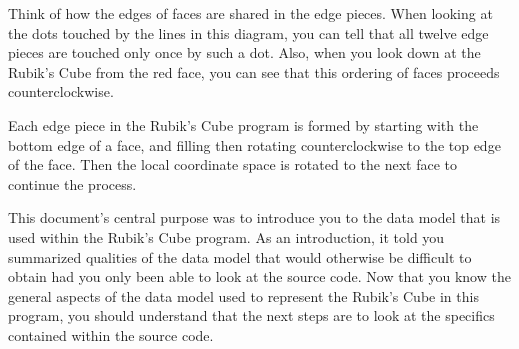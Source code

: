 \documentclass{article}
\begin{document}
Think of how the edges of faces are shared in the edge pieces. When
looking at the dots touched by the lines in this diagram, you can tell
that all twelve edge pieces are touched only once by such a dot. Also,
when you look down at the Rubik's Cube from the red face, you can see
that this ordering of faces proceeds counterclockwise.

Each edge piece in the Rubik's Cube program is formed by starting with
the bottom edge of a face, and filling then rotating counterclockwise
to the top edge of the face. Then the local coordinate space is
rotated to the next face to continue the process.

This document's central purpose was to introduce you to the data model
that is used within the Rubik's Cube program. As an introduction, it
told you summarized qualities of the data model that would otherwise
be difficult to obtain had you only been able to look at the source
code. Now that you know the general aspects of the data model used to
represent the Rubik's Cube in this program, you should understand that
the next steps are to look at the specifics contained within the
source code.
\end{document}
